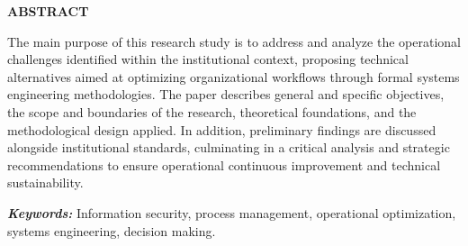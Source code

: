 \ifmostrarabstract
  \newpage
  \thispagestyle{estiloresponsables}

  \begin{center}
    {\fontsize{14pt}{18pt}\selectfont \textbf{ABSTRACT}}
  \end{center}

  \vspace{0.8cm}

  The main purpose of this research study is to address and analyze the operational challenges identified within the institutional context, proposing technical alternatives aimed at optimizing organizational workflows through formal systems engineering methodologies. The paper describes general and specific objectives, the scope and boundaries of the research, theoretical foundations, and the methodological design applied. In addition, preliminary findings are discussed alongside institutional standards, culminating in a critical analysis and strategic recommendations to ensure operational continuous improvement and technical sustainability.

  \vspace{1cm}

  \noindent \textbf{\textit{Keywords:}} Information security, process management, operational optimization, systems engineering, decision making.

  \vfill
  \newpage
\fi
